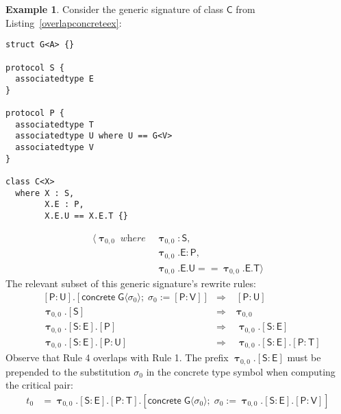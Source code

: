 \documentclass[a4paper,headsepline,bibliography=totoc,toc=flat,fleqn,twoside=semi]{scrbook}
\theoremstyle{definition}
\theoremstyle{definition}
\newtheorem{example}{Example}[chapter]
\theoremstyle{definition}
\newcommand{\namesym}[1]{\mathsf{#1}}
\newcommand{\proto}[1]{\bm{\mathsf{#1}}}
\newcommand{\protosym}[1]{[\proto{#1}]}
\newcommand{\gensig}[2]{\langle #1\;\textit{where}\;#2\rangle}
\newcommand{\genericsym}[2]{\bm{\uptau}_{#1,#2}}
\newcommand{\assocsym}[2]{[\proto{#1}\colon\namesym{#2}]}
\newcommand{\concretesym}[1]{[\mathsf{concrete}\;#1]}
\begin{document}
\begin{example}
Consider the generic signature of class $\namesym{C}$ from Listing~\ref{overlapconcreteex}:
\begin{listing}\label{overlapconcreteex}
\begin{Verbatim}
struct G<A> {}

protocol S {
  associatedtype E
}

protocol P {
  associatedtype T
  associatedtype U where U == G<V>
  associatedtype V
}

class C<X>
  where X : S,
        X.E : P,
        X.E.U == X.E.T {}
\end{Verbatim}
\end{listing}
\begin{align*}
\gensig{\genericsym{0}{0}}{&\genericsym{0}{0}\colon\proto{S},\\
&\genericsym{0}{0}.\namesym{E}\colon\proto{P},\\
&\genericsym{0}{0}.\namesym{E}.\namesym{U}==\genericsym{0}{0}.\namesym{E}.\namesym{T}}
\end{align*}
The relevant subset of this generic signature's rewrite rules:
\begin{align}
&\assocsym{P}{U}.\concretesym{\namesym{G}\langle\sigma_0\rangle;\;\sigma_0:=\assocsym{P}{V}}&\Rightarrow\;&\assocsym{P}{U}\tag{Rule 1}\\
&\genericsym{0}{0}.\protosym{S}&\Rightarrow\;&\genericsym{0}{0}\tag{Rule 2}\\
&\genericsym{0}{0}.\assocsym{S}{E}.\protosym{P}&\Rightarrow\;&\genericsym{0}{0}.\assocsym{S}{E}\tag{Rule 3}\\
&\genericsym{0}{0}.\assocsym{S}{E}.\assocsym{P}{U}&\Rightarrow\;&\genericsym{0}{0}.\assocsym{S}{E}.\assocsym{P}{T}\tag{Rule 4}
\end{align}
Observe that Rule 4 overlaps with Rule 1. The prefix $\genericsym{0}{0}.\assocsym{S}{E}$ must be prepended to the substitution $\sigma_0$ in the concrete type symbol when computing the critical pair:
\begin{align*}
t_0&=\genericsym{0}{0}.\assocsym{S}{E}.\assocsym{P}{T}.\concretesym{\namesym{G}\langle\sigma_0\rangle;\;\sigma_0:=\genericsym{0}{0}.\assocsym{S}{E}.\assocsym{P}{V}}\\

\end{align*}
\end{example}
\end{document}
